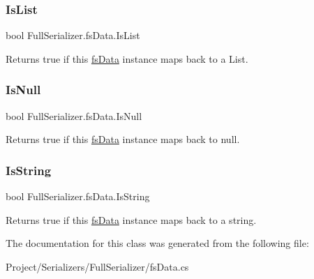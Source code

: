 \subsubsection{\texorpdfstring{Is\+List}{IsList}}
{\footnotesize\ttfamily bool Full\+Serializer.\+fs\+Data.\+Is\+List\hspace{0.3cm}{\ttfamily [get]}}



Returns true if this \hyperlink{class_full_serializer_1_1fs_data}{fs\+Data} instance maps back to a List. 

\mbox{\label{class_full_serializer_1_1fs_data_af434698e3ebdea70932122c1b326c0a8}} 
\subsubsection{\texorpdfstring{Is\+Null}{IsNull}}
{\footnotesize\ttfamily bool Full\+Serializer.\+fs\+Data.\+Is\+Null\hspace{0.3cm}{\ttfamily [get]}}



Returns true if this \hyperlink{class_full_serializer_1_1fs_data}{fs\+Data} instance maps back to null. 

\mbox{\label{class_full_serializer_1_1fs_data_a95589f68382f863386617a0dd4055ae4}} 
\subsubsection{\texorpdfstring{Is\+String}{IsString}}
{\footnotesize\ttfamily bool Full\+Serializer.\+fs\+Data.\+Is\+String\hspace{0.3cm}{\ttfamily [get]}}



Returns true if this \hyperlink{class_full_serializer_1_1fs_data}{fs\+Data} instance maps back to a string. 



The documentation for this class was generated from the following file\+:\begin{DoxyCompactItemize}
\item 
Project/\+Serializers/\+Full\+Serializer/fs\+Data.\+cs\end{DoxyCompactItemize}
